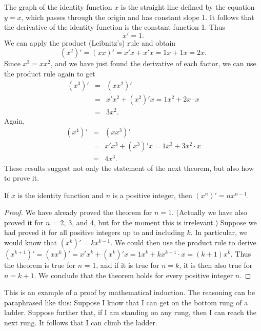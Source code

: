 The graph of the identity function $x$
is the straight line defined by the equation $y = x$,
which passes through the origin and has constant slope 1.
It follows that the derivative of the identity function
is the constant function 1. Thus
\begin{equation}
x'= 1. 
\label{eq1.7.1}
\end{equation}
We can apply the product (Leibnitz's) rule and obtain
$$
(x^2)' = (xx)' = x'x + x'x = 1x + 1x = 2x.
$$
Since $x^3 = x{x^2}$,
and we have just found the derivative of each factor,
we can use the product rule again to get
\begin{eqnarray*} 
(x^3)'
&=&
(x{x^2})' \\
&=&
x'{x^2} + (x^2)'x = 1{x^2} + 2x \cdot x \\
&=&
3x^2. 
\end{eqnarray*}
Again,
\begin{eqnarray*} 
(x^4)'
&=&
(xx^3)' \\
&=&
x'{x^3} + (x^3)'x = 1{x^3} + 3{x^2} \cdot x    \\
&=& 4x^3.
\end{eqnarray*}
These results suggest not only the statement of the next theorem,
but also how to prove it.

\begin{prop}\label{thm 1.7.5}
If $x$ is the identity function and $n$ is a positive integer,
then $(x^n)' = nx^{n-1}$.
\end{prop}

\begin{proof}
We have already proved the theorem for $n = 1$.
(Actually we have also proved it for $n$ = 2, 3, and 4,
but for the moment this is irrelevant.)
Suppose we had proved it for all positive integers up to and including $k$.
In particular, we would know that $(x^k)' = kx^{k-1}$.
We could then use the product rule to derive
$(x^{k+1})'
= (xx^k)'
= x'x^k + (x^k)'x
= 1x^k + kx^{k-1} \cdot x
= (k + 1)x^k$. 
Thus the theorem is true for $n$ = 1,
and if it is true for $n = k$,
it is then also true for $n = k + 1$.
We conclude that the theorem holds for every positive integer $n$.
\end{proof}

This is an example of a proof by mathematical induction.
The reasoning can be paraphrased like this:
Suppose I know that I can get on the bottom rung of a ladder.
Suppose further that, if I am standing on any rung,
then I can reach the next rung.
It follows that I can climb the ladder.

